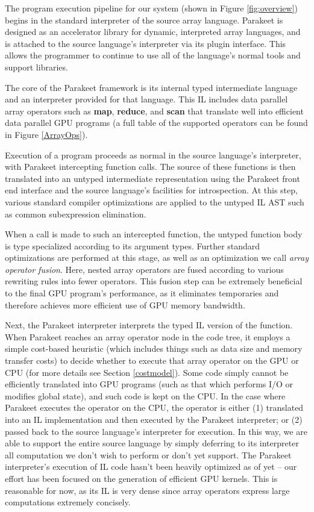 \documentclass[preprint]{sigplanconf}
\begin{document}
The program execution pipeline for our system (shown in Figure \ref{fig:overview}) begins in the standard interpreter of the source array language.  Parakeet is designed as an accelerator library for dynamic, interpreted array languages, and is attached to the source language's interpreter via its plugin interface. This allows the programmer to continue to use all of the language's normal tools and support libraries.

The core of the Parakeet framework is its internal typed intermediate language and an interpreter provided for that language. This IL includes data parallel array operators such as \textbf{map}, \textbf{reduce}, and \textbf{scan} that translate well into efficient data parallel GPU programs (a full table of the supported operators can be found in Figure \ref{ArrayOps}).

Execution of a program proceeds as normal in the source language's interpreter, with Parakeet intercepting function calls.  The source of these functions is then translated into an untyped intermediate representation using the Parakeet front end interface and the source language's facilities for introspection. At this step, various standard compiler optimizations are applied to the untyped IL AST such as common subexpression elimination.

When a call is made to such an intercepted function, the untyped function body is type specialized according to its argument types.  Further standard optimizations are performed at this stage, as well as an optimization we call \emph{array operator fusion}.  Here, nested array operators are fused according to various rewriting rules into fewer operators. This fusion step can be extremely beneficial to the final GPU program's performance, as it eliminates temporaries and therefore achieves more efficient use of GPU memory bandwidth.

Next, the Parakeet interpreter interprets the typed IL version of the function.  When Parakeet reaches an array operator node in the code tree, it employs a simple cost-based heuristic (which includes things such as data size and memory transfer costs) to decide whether to execute that array operator on the GPU or CPU (for more details see Section \ref{costmodel}).  Some code simply cannot be efficiently translated into GPU programs (such as that which performs I/O or modifies global state), and such code is kept on the CPU. In the case where Parakeet executes the operator on the CPU, the operator is either (1) translated into an IL implementation and then executed by the Parakeet interpreter; or (2) passed back to the source language's interpreter for execution. In this way, we are able to support the entire source language by simply deferring to its interpreter all computation we don't wish to perform or don't yet support. The Parakeet interpreter's execution of IL code hasn't been heavily optimized as of yet -- our effort has been focused on the generation of efficient GPU kernels.  This is reasonable for now, as its IL is very dense since array operators express large computations extremely concisely.
\end{document}
